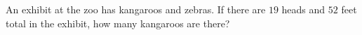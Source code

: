 An exhibit at the zoo has kangaroos and zebras. If there are $19$ heads and $52$ feet total in the exhibit, how many kangaroos are there?

